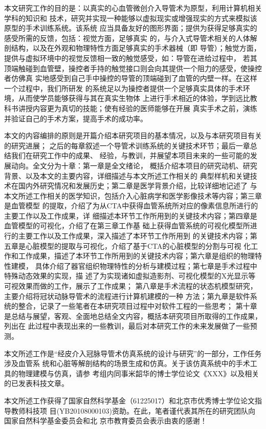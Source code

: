 本文研究工作的目的是：以真实的心血管微创介入导管术为原型，利用计算机相关学科的知识和
技术，研究并实现一种能够以虚拟现实或增强现实的方式来模拟该原型的手术训练系统。该系统
应当具备友好的图形界面；提供为获得足够真实的感受所需的反馈，包括：视觉方面，足够真实
的，与介入式导管术相关的人体解剖结构，以及在外观和物理特性方面足够真实的手术器械（即
导管）；触觉方面，提供与虚拟环境中的视觉反馈相一致的触觉感受，如：导管在进给过程中，
若其顶端触碰到血管壁，操控者手持的触觉接口则会向其提供一个阻力的感受，使操控者仿佛真
实地感受到自己手中操控的导管的顶端碰到了血管的内壁一样。在这样一个过程中，我们所研发
的系统足以为操控者提供一个足够真实具体的手术环境，从而使学员能够获得与其在真实生物体
上进行手术相近的体验，学到远比教科书讲授内容更为真切的技能；使有经验的医师能够在开展
真实手术之前，演练并验证自己的手术方案，提高手术的成功率。

本文的内容编排的原则是开篇介绍本研究项目的基本情况，以及与本研究项目有关的研究进展；
之后的每章叙述一个导管术训练系统的关键技术环节；最后一章总结我们在研究工作中的成果、
经验，与教训，并展望本项目未来的一些可能的发展动向。全文分为十章：第一章是全文绪论，
概括介绍本项目的研究动机、研究背景、以及本文的主要内容，详细描述与本文所述工作相关的
典型样机和关键技术在国内外研究情况和发展历史；第二章是医学背景介绍，比较详细地记述了
与本文所述工作相关的医学知识，包括介入心脏病学和医学影像技术等内容；第三章是血管模型
的提取，介绍了为从CTA中获得血管系统所对应的像素信息所进行的主要工作以及工作成果，详
细描述本环节工作所用到的关键技术内容；第四章是血管模型的可视化，介绍了在第三章工作基
础上获得血管系统的可视化模型所进行的主要工作以及工作成果，深入描述了本环节工作所用到
的关键技术内容；第五章是心脏模型的提取与可视化，介绍了基于CTA的心脏模型的分割与可视
化工作和工作成果，描述了本环节工作所用到的关键技术内容；第六章是组织的物理特性建模，
具体介绍了器官组织物理特性的分析与建模过程；第七章是手术过程中特殊动态效果的实现，描
述了为实现诸如虚拟造影剂、可视化模型的X光显示等可视效果而做的工作，展示了工作成果；
第八章是手术流程的状态机模型研究，主要介绍将冠状动脉导管术的流程进行计算机建模的一种
方法；第九章是软件系统的整合，记录了一些笔者在本研究项目过程中对软件工程的一些思考；
第十章是总结与展望，客观、全面地总结全文内容，概括本研究项目所取得的工作成果，列出在
此过程中表现出来的一些教训，最后对本研究工作的未来发展做了一些预测。

本文所述工作是“经皮介入冠脉导管术仿真系统的设计与研究”的一部分，工作任务涉及血管系
统和心脏等解剖结构的场景生成和仿真。关于该仿真系统中的手术工具的物理建模与仿真，请参
考组内同事米韶华的博士学位论文《XXX》以及相关的已发表科技文章。

本文所述工作获得了国家自然科学基金（61225017）和北京市优秀博士学位论文指导教师科技项
目(YB20108000103)资助。在此，笔者谨代表其所在的研究团队向国家自然科学基金委员会和北
京市教育委员会表示由衷的感谢！ 